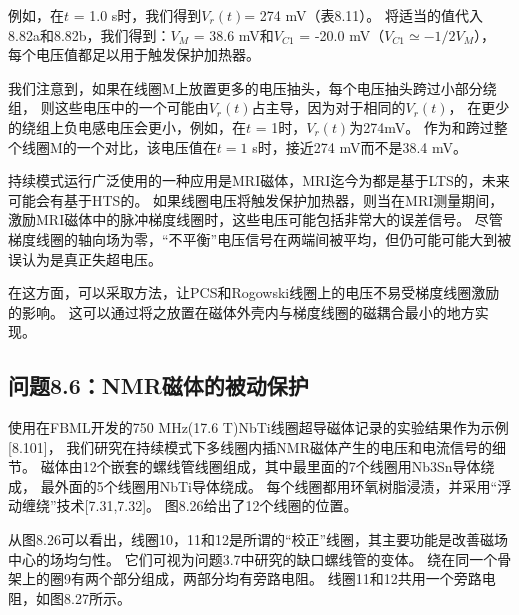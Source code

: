 例如，在$t$ = 1.0 s时，我们得到$V_r(t)$= 274 mV（表8.11）。
将适当的值代入 8.82a和8.82b，我们得到：$V_M$ = 38.6 mV和$V_{C1}$ = -20.0 mV（$V_{C1}\simeq -1/2 V_M$），
每个电压值都足以用于触发保护加热器。

我们注意到，如果在线圈M上放置更多的电压抽头，每个电压抽头跨过小部分绕组，
则这些电压中的一个可能由$V_r(t)$占主导，因为对于相同的$V_r(t)$，
在更少的绕组上负电感电压会更小，例如，在$t$ = 1时，$V_r(t)$为274mV。
作为和跨过整个线圈M的一个对比，该电压值在$t=1$ s时，接近274 mV而不是38.4 mV。

持续模式运行广泛使用的一种应用是MRI磁体，MRI迄今为都是基于LTS的，未来可能会有基于HTS的。
如果线圈电压将触发保护加热器，则当在MRI测量期间，激励MRI磁体中的脉冲梯度线圈时，这些电压可能包括非常大的误差信号。
尽管梯度线圈的轴向场为零，“不平衡”电压信号在两端间被平均，但仍可能可能大到被误认为是真正失超电压。

在这方面，可以采取方法，让PCS和Rogowski线圈上的电压不易受梯度线圈激励的影响。
这可以通过将之放置在磁体外壳内与梯度线圈的磁耦合最小的地方实现。

\subsection{问题8.6：NMR磁体的被动保护}
使用在FBML开发的750 MHz(17.6 T)NbTi线圈超导磁体记录的实验结果作为示例[8.101]，
我们研究在持续模式下多线圈内插NMR磁体产生的电压和电流信号的细节。
磁体由12个嵌套的螺线管线圈组成，其中最里面的7个线圈用Nb3Sn导体绕成，
最外面的5个线圈用NbTi导体绕成。
 每个线圈都用环氧树脂浸渍，并采用“浮动缠绕”技术[7.31,7.32]。 图8.26给出了12个线圈的位置。

从图8.26可以看出，线圈10，11和12是所谓的“校正”线圈，其主要功能是改善磁场中心的场均匀性。
 它们可视为问题3.7中研究的缺口螺线管的变体。 
 绕在同一个骨架上的圈9有两个部分组成，两部分均有旁路电阻。
 线圈11和12共用一个旁路电阻，如图8.27所示。

